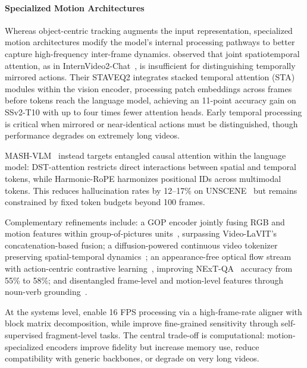 \documentclass[10pt]{article} %
\begin{document}
\paragraph{Specialized Motion Architectures}

Whereas object-centric tracking augments the input representation, specialized motion architectures modify the model's internal processing pathways to better capture high-frequency inter-frame dynamics. \citet{Rasekh2025EnhancingTU} observed that joint spatiotemporal attention, as in InternVideo2-Chat~\citep{Wang2024InternVideo2SF}, is insufficient for distinguishing temporally mirrored actions. Their STAVEQ2 integrates stacked temporal attention (STA) modules within the vision encoder, processing patch embeddings across frames before tokens reach the language model, achieving an 11-point accuracy gain on SSv2-T10 with up to four times fewer attention heads. Early temporal processing is critical when mirrored or near-identical actions must be distinguished, though performance degrades on extremely long videos.

MASH-VLM~\citep{Bae2025MASHVLMMA} instead targets entangled causal attention within the language model: DST-attention restricts direct interactions between spatial and temporal tokens, while Harmonic-RoPE harmonizes positional IDs across multimodal tokens. This reduces hallucination rates by 12--17\% on UNSCENE~\citep{Bae2025MASHVLMMA} but remains constrained by fixed token budgets beyond 100 frames.

Complementary refinements include: a GOP encoder jointly fusing RGB and motion features within group-of-pictures units~\citep{Zhao2025EfficientMV}, surpassing Video-LaVIT's~\citep{Jin2024VideoLaVITUV} concatenation-based fusion; a diffusion-powered continuous video tokenizer preserving spatial-temporal dynamics~\citep{Ge2024DivotDP}; an appearance-free optical flow stream with action-centric contrastive learning~\citep{Chen2023ATMAT}, improving NExT-QA~\citep{xiao2021next} accuracy from 55\% to 58\%; and disentangled frame-level and motion-level features through noun-verb grounding~\citep{Liu2024VideoQA}.

At the systems level, \citet{Li2025ImprovingLV} enable 16 FPS processing via a high-frame-rate aligner with block matrix decomposition, while \citet{Hu2025SF2TSF} improve fine-grained sensitivity through self-supervised fragment-level tasks. The central trade-off is computational: motion-specialized encoders improve fidelity but increase memory use, reduce compatibility with generic backbones, or degrade on very long videos.
\end{document}
